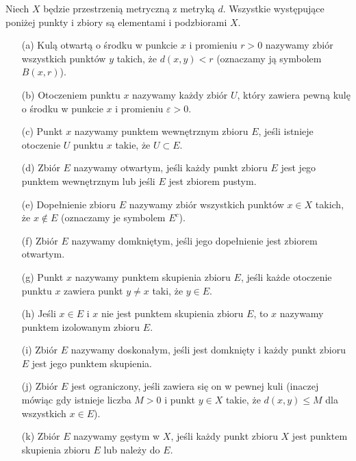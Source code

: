 \documentclass[leqno]{article}
\begin{document}
\begin{justify}
\begin{defn}
    Niech $X$ będzie przestrzenią metryczną z metryką $d$. Wszystkie występujące poniżej punkty i zbiory są elementami i podzbiorami $X$.
    \begin{itemize}
        \item [(a)] Kulą otwartą o środku w punkcie $x$ i promieniu $r > 0$ nazywamy zbiór wszystkich punktów $y$ takich, że $d(x, y) < r$ (oznaczamy ją symbolem $B(x, r)$).
        \item [(b)] Otoczeniem punktu $x$ nazywamy każdy zbiór $U$, który zawiera pewną kulę o środku w punkcie $x$ i promieniu $\varepsilon > 0$. 
        \item [(c)] Punkt $x$ nazywamy punktem wewnętrznym zbioru $E$, jeśli istnieje otoczenie $U$ punktu $x$ takie, że $U \subset E$.
        \item [(d)] Zbiór $E$ nazywamy otwartym, jeśli każdy punkt zbioru $E$ jest jego punktem wewnętrznym lub jeśli $E$ jest zbiorem pustym.
        \item [(e)] Dopełnienie zbioru $E$ nazywamy zbiór wszystkich punktów $x \in X$ takich, że $x \notin E$ (oznaczamy je symbolem $E^c$).
        \item [(f)] Zbiór $E$ nazywamy domkniętym, jeśli jego dopełnienie jest zbiorem otwartym.
        \item [(g)] Punkt $x$ nazywamy punktem skupienia zbioru $E$, jeśli każde otoczenie punktu $x$ zawiera punkt $y \neq x$ taki, że $y \in E$. 
        \item [(h)] Jeśli $x \in E$ i $x$ nie jest punktem skupienia zbioru $E$, to $x$ nazywamy punktem izolowanym zbioru $E$.
        \item [(i)] Zbiór $E$ nazywamy doskonałym, jeśli jest domknięty i każdy punkt zbioru $E$ jest jego punktem skupienia.
        \item [(j)] Zbiór $E$ jest ograniczony, jeśli zawiera się on w pewnej kuli (inaczej mówiąc gdy istnieje liczba $M > 0$ i punkt $y \in X$ takie, że $d(x, y) \leqslant M$ dla wszystkich $x \in E$).
        \item [(k)] Zbiór $E$ nazywamy gęstym w $X$, jeśli każdy punkt zbioru $X$ jest punktem skupienia zbioru $E$ lub należy do $E$.
    \end{itemize}
\end{defn}


\end{justify}
\end{document}

